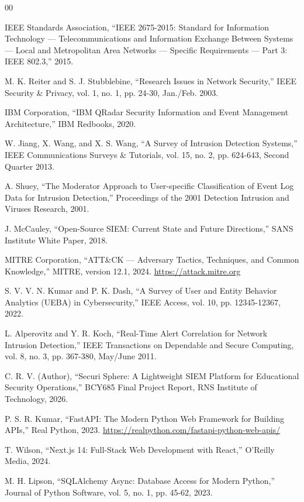 \begin{thebibliography}{00}

IEEE Standards Association, “IEEE 2675-2015: Standard for Information Technology — Telecommunications and Information Exchange Between Systems — Local and Metropolitan Area Networks — Specific Requirements — Part 3: IEEE 802.3,” 2015.

M. K. Reiter and S. J. Stubblebine, “Research Issues in Network Security,” IEEE Security \& Privacy, vol. 1, no. 1, pp. 24-30, Jan./Feb. 2003.

IBM Corporation, “IBM QRadar Security Information and Event Management Architecture,” IBM Redbooks, 2020.

W. Jiang, X. Wang, and X. S. Wang, “A Survey of Intrusion Detection Systems,” IEEE Communications Surveys \& Tutorials, vol. 15, no. 2, pp. 624-643, Second Quarter 2013.

A. Shuey, “The Moderator Approach to User-specific Classification of Event Log Data for Intrusion Detection,” Proceedings of the 2001 Detection Intrusion and Viruses Research, 2001.

J. McCauley, “Open-Source SIEM: Current State and Future Directions,” SANS Institute White Paper, 2018.

MITRE Corporation, “ATT\&CK — Adversary Tactics, Techniques, and Common Knowledge,” MITRE, version 12.1, 2024. \url{https://attack.mitre.org}

S. V. V. N. Kumar and P. K. Dash, “A Survey of User and Entity Behavior Analytics (UEBA) in Cybersecurity,” IEEE Access, vol. 10, pp. 12345-12367, 2022.

L. Alperovitz and Y. R. Koch, “Real-Time Alert Correlation for Network Intrusion Detection,” IEEE Transactions on Dependable and Secure Computing, vol. 8, no. 3, pp. 367-380, May/June 2011.

C. R. V. (Author), “Securi Sphere: A Lightweight SIEM Platform for Educational Security Operations,” BCY685 Final Project Report, RNS Institute of Technology, 2026.

P. S. R. Kumar, “FastAPI: The Modern Python Web Framework for Building APIs,” Real Python, 2023. \url{https://realpython.com/fastapi-python-web-apis/}

T. Wilson, “Next.js 14: Full-Stack Web Development with React,” O'Reilly Media, 2024.

M. H. Lipson, “SQLAlchemy Async: Database Access for Modern Python,” Journal of Python Software, vol. 5, no. 1, pp. 45-62, 2023.


\end{thebibliography}
